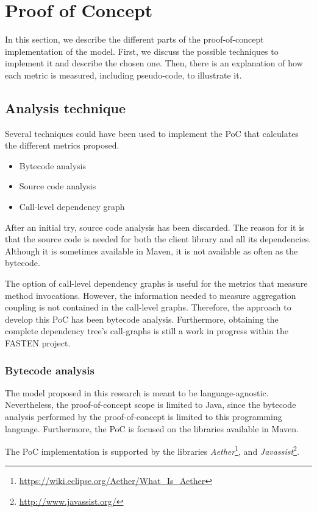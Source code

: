 \chapter{Proof of Concept}\label{ch:PoC}
In this section, we describe the different parts of the proof-of-concept implementation of the model. First, we discuss the possible techniques to implement it and describe the chosen one. Then, there is an explanation of how each metric is measured, including pseudo-code, to illustrate it.

\section{Analysis technique}
Several techniques could have been used to implement the PoC that calculates the different metrics proposed.

\begin{itemize}
  \item Bytecode analysis
  \item Source code analysis
  \item Call-level dependency graph
\end{itemize}

After an initial try, source code analysis has been discarded. The reason for it is that the source code is needed for both the client library and all its dependencies. Although it is sometimes available in Maven, it is not available as often as the bytecode.

The option of call-level dependency graphs is useful for the metrics that measure method invocations. However, the information needed to measure aggregation coupling is not contained in the call-level graphs. Therefore, the approach to develop this PoC has been bytecode analysis. Furthermore, obtaining the complete dependency tree's call-graphs is still a work in progress within the FASTEN project.

\subsection{Bytecode analysis}
The model proposed in this research is meant to be language-agnostic. Nevertheless, the proof-of-concept scope is limited to Java, since the bytecode analysis performed by the proof-of-concept is limited to this programming language. Furthermore, the PoC is focused on the libraries available in Maven.

The PoC implementation is supported by the libraries  \textit{Aether}\footnote{\url{https://wiki.eclipse.org/Aether/What_Is_Aether}}, and \textit{Javassist}\footnote{\url{http://www.javassist.org/}}.

